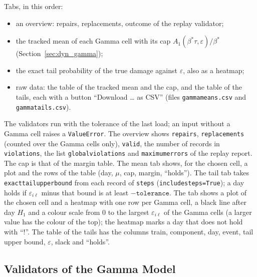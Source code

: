 \documentclass[11pt,a4paper]{article}
\theoremstyle{plain}
\theoremstyle{definition}
\renewcommand{\_}{\textunderscore\allowbreak{}}
\begin{document}
Tabs, in this order:
\begin{itemize}[nosep]
  \item an overview: repairs, replacements, outcome of the replay validator;
  \item the tracked mean of each Gamma cell with its cap $A_1(\beta^*\tau,\varepsilon)/\beta^*$ (Section~\ref{sec:dyn_gamma});
  \item the exact tail probability of the true damage against $\varepsilon$, also as a heatmap;
  \item raw data: the table of the tracked mean and the cap, and the table of the tails, each with a button ``Download \ldots{} as CSV'' (files \texttt{gamma\_means.csv} and \texttt{gamma\_tails.csv}).
\end{itemize}
The validators run with the tolerance of the last load; an input without a Gamma cell raises a \texttt{ValueError}. The overview shows \texttt{repairs}, \texttt{replacements} (counted over the Gamma cells only), \texttt{valid}, the number of records in \texttt{violations}, the list \texttt{global\_violations} and \texttt{maximum\_errors} of the replay report. The cap is that of the margin table. The mean tab shows, for the chosen cell, a plot and the rows of the table (day, $\mu$, cap, margin, ``holds''). The tail tab takes \texttt{exact\_tail\_upper\_bound} from each record of \texttt{steps} (\texttt{include\_steps=True}); a day holds if $\varepsilon_{i\ell}$ minus that bound is at least $-\texttt{tolerance}$. The tab shows a plot of the chosen cell and a heatmap with one row per Gamma cell, a black line after day $H_1$ and a colour scale from $0$ to the largest $\varepsilon_{i\ell}$ of the Gamma cells (a larger value has the colour of the top); the heatmap marks a day that does not hold with ``!''. The table of the tails has the columns train, component, day, event, tail upper bound, $\varepsilon$, slack and ``holds''.

\subsection{Validators of the Gamma Model}
\label{sec:validation_gamma}
\end{document}
